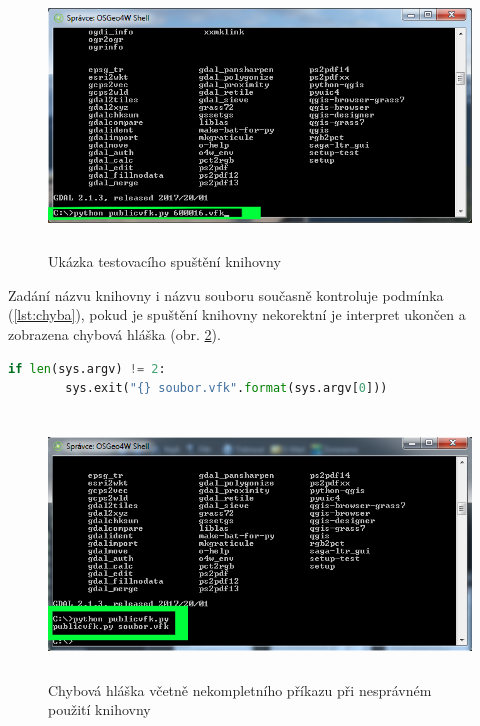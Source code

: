 \begin{figure}[H]
	 \centering
      \includegraphics[height=7cm]{./pictures/testovani_ukazka.png}
      \caption{Ukázka testovacího spuštění knihovny}
      \label{fig:testovani_ukazka}
  \end{figure}

Zadání názvu knihovny i názvu  souboru současně kontroluje
podmínka (\ref{lst:chyba}), pokud je spuštění knihovny nekorektní je
interpret ukončen a zobrazena chybová hláška
(obr. \ref{fig:testovani_hlaska}).
\begin{lstlisting}[caption=Podmínka pro spouštěcí příkaz, language=Python, label=lst:chyba, numbers=none]
    if len(sys.argv) != 2:
        sys.exit("{} soubor.vfk".format(sys.argv[0]))
\end{lstlisting}

\begin{figure}[H]
	 \centering
      \includegraphics[height=7cm]{./pictures/testovani_hlaska.png}
      \caption{Chybová hláška včetně nekompletního příkazu při nesprávném použití knihovny}
      \label{fig:testovani_hlaska}
  \end{figure}

